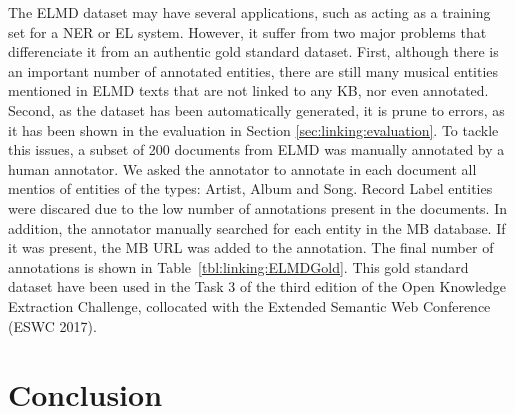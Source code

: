 The \textsc{ELMD} dataset may have several applications, such as acting as a training set for a NER or EL system. However, it suffer from two major problems that differenciate it from an authentic gold standard dataset. First, although there is an important number of annotated entities, there are still many musical entities mentioned in \textsc{ELMD} texts that are not linked to any KB, nor even annotated. Second, as the dataset has been automatically generated, it is prune to errors, as it has been shown in the evaluation in Section \ref{sec:linking:evaluation}. To tackle this issues, a subset of 200 documents from \textsc{ELMD} was manually annotated by a human annotator. We asked the annotator to annotate in each document all mentios of entities of the types: Artist, Album and Song. Record Label entities were discared due to the low number of annotations present in the documents. In addition, the annotator manually searched for each entity in the MB database. If it was present, the MB URL was added to the annotation. The final number of annotations is shown in Table~\ref{tbl:linking:ELMDGold}.
This gold standard dataset have been used in the Task 3 of the third edition of the Open Knowledge Extraction Challenge, collocated with the Extended Semantic Web Conference (ESWC 2017)\cite{}.



\section{Conclusion}
\label{sec:elmd}

